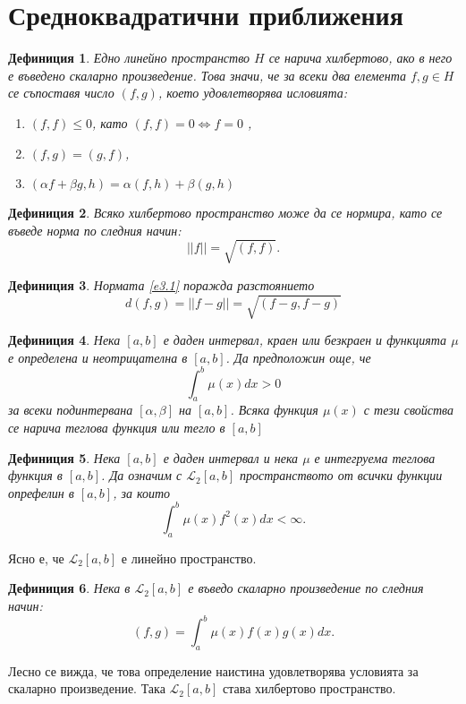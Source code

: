 \documentclass[12pt]{article}
\numberwithin{equation}{section}
\newtheorem{definition}{Дефиниция}
\numberwithin{theorem}{section}
\numberwithin{definition}{section}
\numberwithin{corollary}{section}
\begin{document}
\section{Средноквадратични приближения}
\begin{definition}
Едно линейно пространство $H$ се нарича хилбертово, ако в него е въведено скаларно произведение. Това значи, че за всеки два елемента $f,g \in H$ се съпоставя число $(f,g)$, което удовлетворява исловията:
\begin{enumerate}
    \item $(f,f)\leq 0$, като $(f,f) = 0 \iff f=0$ ,
    \item $(f,g) = (g,f)$,
    \item $(\alpha f +\beta g, h) = \alpha (f,h) + \beta(g,h)$
\end{enumerate}    
\end{definition}
\begin{definition}
Всяко хилбертово пространство може да се нормира, като се въведе норма по следния начин:
\begin{equation}\label{e3.1}
||f|| = \sqrt{(f,f)}.
\end{equation}
\end{definition}
\begin{definition}
Нормата \ref{e3.1} поражда разстоянието
\[
d(f,g) = ||f-g|| = \sqrt{(f-g,f-g)}
\]
\end{definition}
\begin{definition}
Нека $[a,b]$ е даден интервал, краен или безкраен и функцията $\mu$ е определена и неотрицателна в $[a,b]$. Да предположин още, че
\[
\int_a^b\mu(x)dx > 0
\]
за всеки подинтервана $[\alpha, \beta] $ на $[a,b]$. Всяка функция $\mu(x)$ с тези свойства се нарича теглова функция или тегло в $[a,b]$
\end{definition}
\begin{definition}
Нека $[a,b]$ е даден интервал и нека $\mu$ е интегруема теглова функция в $[a,b]$. Да означим с $\mathcal{L}_2[a,b]$ пространството от всички функции опрефелин в $[a,b]$, за които
\[
\int_a^b \mu(x)f^2(x)dx < \infty.
\]
\end{definition}
Ясно е, че $\mathcal{L}_2[a,b]$ е линейно пространство.
\begin{definition}
Нека в $\mathcal{L}_2[a,b]$ е въведо скаларно произведение по следния начин:
\[
(f,g) = \int_a^b\mu(x)f(x)g(x)dx.
\]
\end{definition}
\par
Лесно се вижда, че това определение наистина удовлетворява условията за скаларно произведение. Така $\mathcal{L}_2[a,b]$ става хилбертово пространство.
\end{document}
